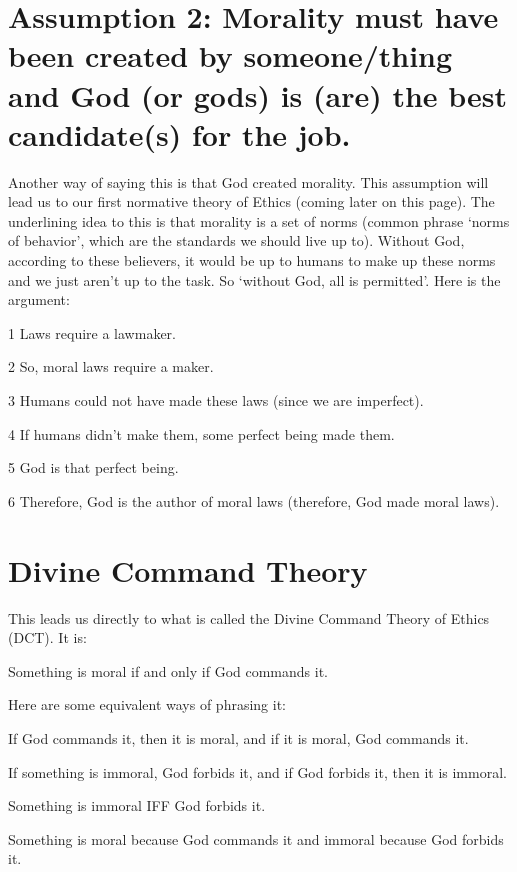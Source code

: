 \section{Assumption 2: Morality must have been created by someone/thing and God (or gods) is (are) the best candidate(s) for the job.}

Another way of saying this is that God created morality. This assumption will lead us to our first normative theory of Ethics (coming later on this page). The underlining idea to this is that morality is a set of norms (common phrase ‘norms of behavior’, which are the standards we should live up to). Without God, according to these believers, it would be up to humans to make up these norms and we just aren’t up to the task. So ‘without God, all is permitted’. Here is the argument:
\begin{earg}
    \item[1] Laws require a lawmaker.
    \item[2] So, moral laws require a maker.
    \item[3] Humans could not have made these laws (since we are imperfect).
    \item[4] If humans didn’t make them, some perfect being made them.
    \item[5] God is that perfect being.
    \item[6] Therefore, God is the author of moral laws (therefore, God made moral laws).
\end{earg}

\section{Divine Command Theory}

This leads us directly to what is called the \gls{Divine Command Theory} of Ethics (DCT). It is:
\begin{center}
Something is moral if and only if God commands it.
\end{center}
Here are some equivalent ways of phrasing it:
\begin{earg}
    \item If God commands it, then it is moral, and if it is moral, God commands it.
    \item If something is immoral, God forbids it, and if God forbids it, then it is immoral.
    \item Something is immoral IFF God forbids it.
    \item Something is moral because God commands it and immoral because God forbids it.
\end{earg}

